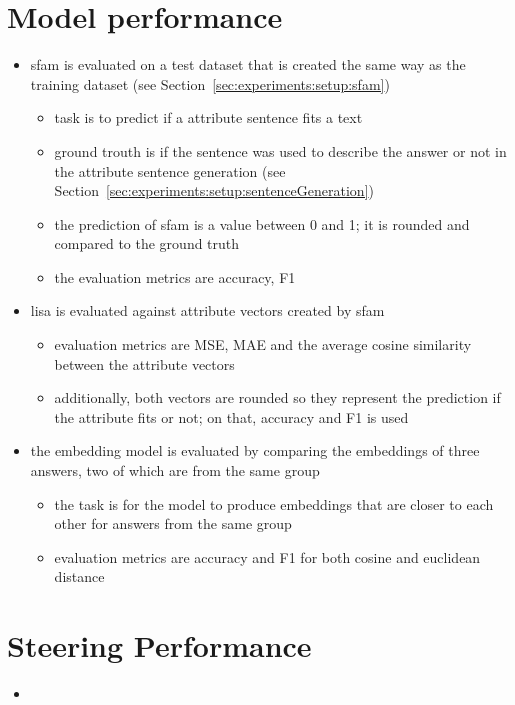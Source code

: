 \section{Model performance}
\label{sec:experiments:models}

\begin{itemize}
  \item \ac{sfam} is evaluated on a test dataset that is created the same way as the training dataset (see Section~\ref{sec:experiments:setup:sfam})
        \begin{itemize}
          \item task is to predict if a attribute sentence fits a text
          \item ground trouth is if the sentence was used to describe the answer or not in the attribute sentence generation (see Section~\ref{sec:experiments:setup:sentenceGeneration})
          \item the prediction of \ac{sfam} is a value between \num{0} and \num{1}; it is rounded and compared to the ground truth
          \item the evaluation metrics are accuracy, F1
        \end{itemize}
  \item \ac{lisa} is evaluated against attribute vectors created by \ac{sfam}
        \begin{itemize}
          \item evaluation metrics are MSE, MAE and the average cosine similarity between the attribute vectors
          \item additionally, both vectors are rounded so they represent the prediction if the attribute fits or not; on that, accuracy and F1 is used
        \end{itemize}
  \item the embedding model is evaluated by comparing the embeddings of three answers, two of which are from the same group
        \begin{itemize}
          \item the task is for the model to produce embeddings that are closer to each other for answers from the same group
          \item evaluation metrics are accuracy and F1 for both cosine and euclidean distance
        \end{itemize}
\end{itemize}

\section{Steering Performance}
\label{sec:experiments:steering}
\begin{itemize}
  \item
\end{itemize}

